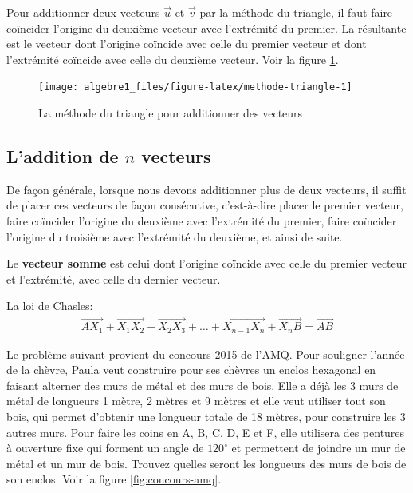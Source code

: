 \documentclass[]{book}
\theoremstyle{definition}
\theoremstyle{definition}
\theoremstyle{definition}
\theoremstyle{remark}
\let\BeginKnitrBlock\begin \let\EndKnitrBlock\end
\begin{document}
Pour additionner deux vecteurs \(\overrightarrow{u}\) et \(\overrightarrow{v}\) par la méthode du triangle, il faut faire coïncider l'origine du deuxième vecteur avec l'extrémité du premier. La résultante est le vecteur dont l'origine coïncide avec celle du premier vecteur et dont l'extrémité coïncide avec celle du deuxième vecteur. Voir la figure \ref{fig:methode-triangle}.

\begin{figure}

{\centering \texttt{[image: algebre1\_files/figure-latex/methode-triangle-1]} 

}

\caption{La méthode du triangle pour additionner des vecteurs}\label{fig:methode-triangle}
\end{figure}

\hypertarget{laddition-de-n-vecteurs}{%
\subsection{\texorpdfstring{L'addition de \(n\) vecteurs}{L'addition de n vecteurs}}\label{laddition-de-n-vecteurs}}

De façon générale, lorsque nous devons additionner plus de deux vecteurs, il suffit de placer ces vecteurs de façon consécutive, c'est-à-dire placer le premier vecteur, faire coïncider l'origine du deuxième avec l'extrémité du premier, faire coïncider l'origine du troisième avec l'extrémité du deuxième, et ainsi de suite.

Le \textbf{vecteur somme} est celui dont l'origine coïncide avec celle du premier vecteur et l'extrémité, avec celle du dernier vecteur.

\BeginKnitrBlock{remark}
{}La loi de Chasles:
\begin{align*}
\overrightarrow{AX_1}+\overrightarrow{X_1X_2}+\overrightarrow{X_2X_3}+\ldots+\overrightarrow{X_{n-1}X_n}+\overrightarrow{X_n B}=\overrightarrow{AB}
\end{align*}
\EndKnitrBlock{remark}

\BeginKnitrBlock{example}
\protect\hypertarget{exm:unnamed-chunk-139}{}{\label{exm:unnamed-chunk-139} }Le problème suivant provient du concours 2015 de l'AMQ. Pour souligner l'année de la chèvre, Paula veut construire pour ses chèvres un enclos hexagonal en faisant alterner des murs de métal et des murs de bois. Elle a déjà les 3 murs de métal de longueurs 1 mètre, 2 mètres et 9 mètres et elle veut utiliser tout son bois, qui permet d'obtenir une longueur totale de 18 mètres, pour construire les 3 autres murs. Pour faire les coins en A, B, C, D, E et F, elle utilisera des pentures à ouverture fixe qui forment un angle de \(120^{\circ}\) et permettent de joindre un mur de
métal et un mur de bois. Trouvez quelles seront les longueurs des murs de bois de son enclos. Voir la figure \ref{fig:concours-amq}.
\EndKnitrBlock{example}
\end{document}
